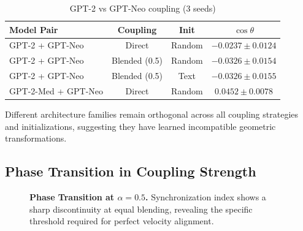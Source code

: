 \documentclass[10pt]{article} %
\theoremstyle{plain}
\theoremstyle{definition}
\theoremstyle{remark}
\begin{document}
\begin{table}[htbp]
\centering
\caption{GPT-2 vs GPT-Neo coupling (3 seeds)}
\label{tab:cross_arch}
\small
\begin{tabular}{lccc}
\toprule
\textbf{Model Pair} & \textbf{Coupling} & \textbf{Init} & \textbf{$\cos \theta$} \\
\midrule
GPT-2 + GPT-Neo & Direct & Random & $-0.0237 \pm 0.0124$ \\
GPT-2 + GPT-Neo & Blended (0.5) & Random & $-0.0326 \pm 0.0154$ \\
GPT-2 + GPT-Neo & Blended (0.5) & Text & $-0.0326 \pm 0.0155$ \\
GPT-2-Med + GPT-Neo & Direct & Random & $0.0452 \pm 0.0078$ \\
\bottomrule
\end{tabular}
\end{table}

Different architecture families remain orthogonal across all coupling strategies and initializations, suggesting they have learned incompatible geometric transformations.

\subsection{Phase Transition in Coupling Strength}

\begin{figure}[htbp]
\centering
{}
\caption{\textbf{Phase Transition at $\alpha = 0.5$.} Synchronization index shows a sharp discontinuity at equal blending, revealing the specific threshold required for perfect velocity alignment.}
\label{fig:phase_transition}
\end{figure}
\end{document}
